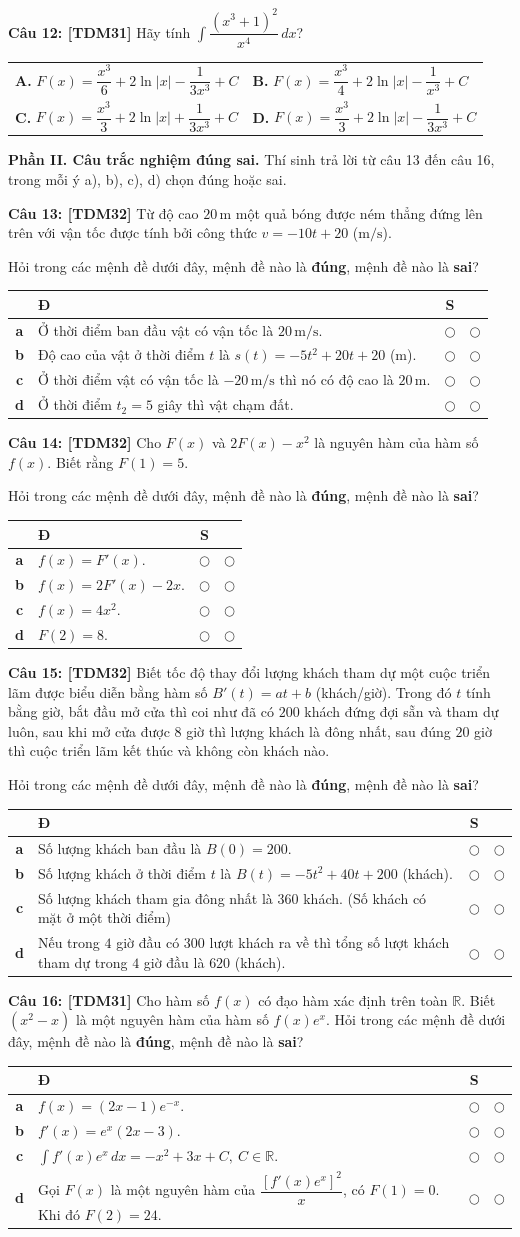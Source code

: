 \documentclass[12pt,a4paper]{article}
\makeatletter
\newcommand{\question}[2][TDM31]{%
  \par\addvspace{2pt}\noindent\textbf{\textcolor{sectionpurple}{Câu #2:} \textcolor{noteborder}{[#1]}}\enspace}
\newcommand{\answerlabel}[1]{\textbf{\textcolor{sectionpurple}{#1.}}}
\newcommand{\twochoices}[4]{%
 \par\nobreak\vspace{1pt}\begin{tabularx}{\linewidth}{@{}>{\raggedright\arraybackslash}X>{\raggedright\arraybackslash}X@{}}
 \answerlabel{A} #1 & \answerlabel{B} #2 \\[1pt]
 \answerlabel{C} #3 & \answerlabel{D} #4
 \end{tabularx}\par}
\newcommand{\tfbox}[4]{%
\begin{notebox}\renewcommand{\arraystretch}{1.17}\setlength{\tabcolsep}{4pt}
\begin{tabularx}{\linewidth}{|>{\bfseries\color{sectionpurple}}c|>{\raggedright\arraybackslash}X|c|c|}
\hline\multicolumn{2}{|c|}{\textbf{\textcolor{sectionpurple}{Mệnh đề}}}&
\textbf{\textcolor{sectionpurple}{Đ}}&\textbf{\textcolor{sectionpurple}{S}}\\\hline
 a & #1 & $\bigcirc$ & $\bigcirc$ \\ \hline
 b & #2 & $\bigcirc$ & $\bigcirc$ \\ \hline
 c & #3 & $\bigcirc$ & $\bigcirc$ \\ \hline
 d & #4 & $\bigcirc$ & $\bigcirc$ \\ \hline
\end{tabularx}\end{notebox}}
\newcommand{\parttwo}[2]{\par\addvspace{4pt}\textbf{Phần II. Câu trắc nghiệm đúng sai.} Thí sinh trả lời từ câu #1 đến câu #2, trong mỗi ý a), b), c), d) chọn đúng hoặc sai.\par}
\makeatother
\begin{document}
\question[TDM31]{12} Hãy tính $\displaystyle\int\!\dfrac{(x^3+1)^2}{x^4}\,dx$?
\twochoices{$F(x)=\dfrac{x^3}{6}+2\ln|x|-\dfrac{1}{3x^3}+C$}
{$F(x)=\dfrac{x^3}{4}+2\ln|x|-\dfrac{1}{x^3}+C$}
{$F(x)=\dfrac{x^3}{3}+2\ln|x|+\dfrac{1}{3x^3}+C$}
{$F(x)=\dfrac{x^3}{3}+2\ln|x|-\dfrac{1}{3x^3}+C$}

\parttwo{13}{16}
\question[TDM32]{13} Từ độ cao $20\,\mathrm{m}$ một quả bóng được ném thẳng đứng lên trên với vận tốc được tính bởi công thức $v=-10t+20$ ($\mathrm{m/s}$).\par
Hỏi trong các mệnh đề dưới đây, mệnh đề nào là \textbf{đúng}, mệnh đề nào là \textbf{sai}?
\tfbox{Ở thời điểm ban đầu vật có vận tốc là $20\,\mathrm{m/s}$.}
{Độ cao của vật ở thời điểm $t$ là $s(t)=-5t^2+20t+20$ ($\mathrm{m}$).}
{Ở thời điểm vật có vận tốc là $-20\,\mathrm{m/s}$ thì nó có độ cao là $20\,\mathrm{m}$.}
{Ở thời điểm $t_2=5$ giây thì vật chạm đất.}

\question[TDM32]{14} Cho $F(x)$ và $2F(x)-x^2$ là nguyên hàm của hàm số $f(x)$. Biết rằng $F(1)=5$.\par
Hỏi trong các mệnh đề dưới đây, mệnh đề nào là \textbf{đúng}, mệnh đề nào là \textbf{sai}?
\tfbox{$f(x)=F'(x)$.}
{$f(x)=2F'(x)-2x$.}
{$f(x)=4x^2$.}
{$F(2)=8$.}

\question[TDM32]{15} Biết tốc độ thay đổi lượng khách tham dự một cuộc triển lãm được biểu diễn bằng hàm số $B'(t)=at+b$ (khách/giờ). Trong đó $t$ tính bằng giờ, bắt đầu mở cửa thì coi như đã có $200$ khách đứng đợi sẵn và tham dự luôn, sau khi mở cửa được $8$ giờ thì lượng khách là đông nhất, sau đúng $20$ giờ thì cuộc triển lãm kết thúc và không còn khách nào.\par
Hỏi trong các mệnh đề dưới đây, mệnh đề nào là \textbf{đúng}, mệnh đề nào là \textbf{sai}?
\tfbox{Số lượng khách ban đầu là $B(0)=200$.}
{Số lượng khách ở thời điểm $t$ là $B(t)=-5t^2+40t+200$ (khách).}
{Số lượng khách tham gia đông nhất là $360$ khách. (Số khách có mặt ở một thời điểm)}
{Nếu trong $4$ giờ đầu có $300$ lượt khách ra về thì tổng số lượt khách tham dự trong $4$ giờ đầu là $620$ (khách).}

\question[TDM31]{16} Cho hàm số $f(x)$ có đạo hàm xác định trên toàn $\mathbb R$. Biết $(x^2-x)$ là một nguyên hàm của hàm số $f(x)e^x$. Hỏi trong các mệnh đề dưới đây, mệnh đề nào là \textbf{đúng}, mệnh đề nào là \textbf{sai}?
\tfbox{$f(x)=(2x-1)e^{-x}$.}
{$f'(x)=e^x(2x-3)$.}
{$\displaystyle\int f'(x)e^x\,dx=-x^2+3x+C,\ C\in\mathbb R$.}
{Gọi $F(x)$ là một nguyên hàm của $\dfrac{[f'(x)e^x]^2}{x}$, có $F(1)=0$. Khi đó $F(2)=24$.}
\end{document}
